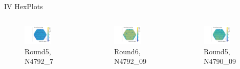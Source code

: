 \documentclass{beamer}
\begin{document}
\begin{frame}{IV HexPlots}
  \begin{columns}
    \begin{figure}
      \includegraphics[width=0.7\textwidth]{plots/N4792_7.pdf}
      \caption{Round5, N4792\_7}
    \end{figure}

    \begin{figure}
      \includegraphics[width=0.7\textwidth]{plots/N4792_09.pdf}
      \caption{Round6, N4792\_09}
    \end{figure}


    \begin{figure}
      \includegraphics[width=0.7\textwidth]{plots/N4790_09.pdf}
      \caption{Round5, N4790\_09}
    \end{figure}


\end{columns}
\end{frame}
\end{document}
